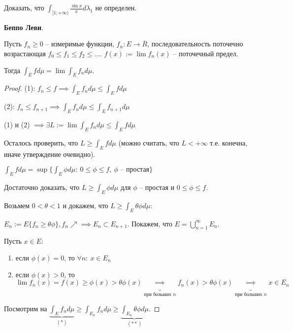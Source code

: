 \begin{exerc}
    Доказать, что $\int_{[1; +\infty)}{\frac{\sin{x}}{x} d \lambda_1}$ не определен.
\end{exerc}


\begin{theorem}
    \textbf{Беппо Леви}.

    Пусть $f_n \geq 0$ -- измеримые функции, $f_n: E \to \overline{R}$, последовательность поточечно возрастающая $f_0 \leq f_1 \leq f_2 \leq \dots$. $f(x) := \lim{f_n(x)}$ -- поточечный предел.

    Тогда $\int_E {f d \mu} = \lim{\int_E {f_n d \mu}}$.
\end{theorem}
\begin{proof}
    (1): $f_n \leq f \implies \int_E {f_n d \mu} \leq \int_E{f d \mu}$

    (2): $f_n \leq f_{n+1} \implies \int_E{f_n d \mu} \leq \int_E{f_{n+1} d \mu}$

    (1) и (2) $\implies \exists L := \lim{\int_E{f_n d \mu}} \leq \int_E{f d \mu}$

    Осталось проверить, что $L \geq \int_E{f d \mu}$ (можно считать, что $L < +\infty$ т.е. конечна, иначе утверждение очевидно).

    $\int_E {f d \mu} = \sup \{ \int_E {\phi d \mu}: \ 0 \leq \phi \leq f, \ \phi \text{ -- простая} \}$
    
    Достаточно доказать, что $L \geq \int_E{\phi d \mu}$ для $\phi$ -- простая и $0 \leq \phi \leq f$.

    Возьмем $0 < \theta < 1$ и докажем, что $L \geq \int_E {\theta \phi d \mu}$:

    $E_n := E \{ f_n \geq \theta \phi \}, f_n \nearrow \implies E_n \subset E_{n+1}$. Покажем, что $E = \bigcup_{n=1}^{\infty} E_n$.

    Пусть $x \in E$:
    
    \begin{enumerate}
        \item если $\phi(x) = 0$, то $\forall n : \ x \in E_n$
        \item если $\phi(x) > 0$, то $\lim{f_n(x)} = f(x) \geq \phi(x) > \theta \phi(x) \underbrace{\implies}_{\text{при больших }n} f_n(x) > \theta \phi(x) \underbrace{\implies}_{\text{при больших }n} x \in E_n$
    \end{enumerate}


    Посмотрим на $\underbrace{\int_E{f_n d \mu}}_{(*)} \geq \int_{E_n}{f_n d \mu} \geq \underbrace{\int_{E_n}{\theta \phi d \mu}}_{(**)}$.


\end{proof}
